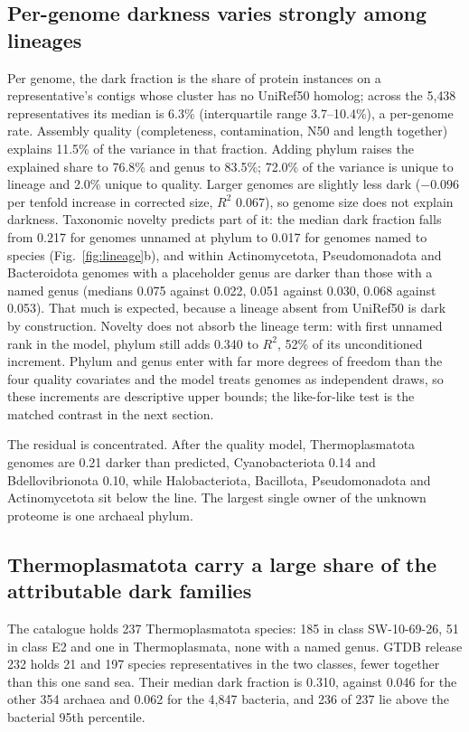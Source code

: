 \documentclass[11pt]{article}
\begin{document}
\subsection*{Per-genome darkness varies strongly among lineages}

Per genome, the dark fraction is the share of protein instances on a representative's contigs whose
cluster has no UniRef50 homolog; across the 5{,}438 representatives its median is 6.3\%
(interquartile range 3.7--10.4\%), a per-genome rate. Assembly quality (completeness, contamination, N50 and length together) explains 11.5\% of the
variance in that fraction. Adding phylum raises the explained share to 76.8\% and genus to 83.5\%;
72.0\% of the variance is unique to lineage and 2.0\% unique to quality.
Larger genomes are slightly less dark ($-0.096$ per tenfold increase in corrected size, $R^2$ 0.067),
so genome size does not explain darkness. Taxonomic novelty predicts part of it: the median dark
fraction falls from 0.217 for genomes unnamed at phylum to 0.017 for genomes named to species
(Fig.~\ref{fig:lineage}b), and within Actinomycetota, Pseudomonadota and Bacteroidota genomes with a
placeholder genus are darker than those with a named genus (medians 0.075 against 0.022, 0.051
against 0.030, 0.068 against 0.053). That much is expected, because a lineage absent from UniRef50
is dark by construction. Novelty does not absorb the lineage term: with first unnamed rank in the
model, phylum still adds 0.340 to $R^2$, 52\% of its unconditioned increment. Phylum and genus enter
with far more degrees of freedom than the four quality covariates and the model treats genomes as
independent draws, so these increments are descriptive upper bounds; the like-for-like test is the
matched contrast in the next section.

The residual is concentrated. After the quality model, Thermoplasmatota genomes are 0.21 darker than
predicted, Cyanobacteriota 0.14 and Bdellovibrionota 0.10, while Halobacteriota, Bacillota,
Pseudomonadota and Actinomycetota sit below the line. The largest single
owner of the unknown proteome is one archaeal phylum.

\subsection*{Thermoplasmatota carry a large share of the attributable dark families}

The catalogue holds 237 Thermoplasmatota species: 185 in class SW-10-69-26, 51 in class E2 and one
in Thermoplasmata, none with a named genus. GTDB release 232 holds 21 and 197 species
representatives in the two classes, fewer together than this one sand sea. Their median dark
fraction is 0.310, against 0.046 for the other 354 archaea and 0.062 for the 4{,}847 bacteria, and
236 of 237 lie above the bacterial 95th percentile.
\end{document}
